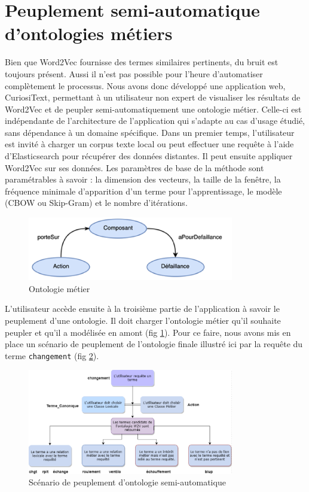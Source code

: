 \section{Peuplement semi-automatique d'ontologies métiers}

Bien que Word2Vec fournisse des termes similaires pertinents, du bruit est toujours présent. Aussi il n'est pas possible pour l'heure d'automatiser complètement le processus. Nous avons donc développé une application web, CuriosiText, permettant à un utilisateur non expert de visualiser les résultats de Word2Vec et de peupler semi-automatiquement une ontologie métier. Celle-ci est indépendante de l'architecture de l'application qui s'adapte au cas d'usage étudié, sans dépendance à un domaine spécifique. Dans un premier temps, l'utilisateur est invité à charger un corpus texte local ou peut effectuer une requête à l'aide d'Elasticsearch pour récupérer des données distantes. Il peut ensuite appliquer Word2Vec sur ses données. Les paramètres de base de la méthode sont paramétrables à savoir : la dimension des vecteurs, la taille de la fenêtre, la fréquence minimale d'apparition d’un terme pour l’apprentissage, le modèle (CBOW ou Skip-Gram) et le nombre d’itérations.
%
\begin{figure}[tb]
    \begin{center}
        \includegraphics[width=9cm]{figures/ontMetier}
    \end{center}
    \caption{Ontologie métier}\label{fig:metier}
\end{figure}
%
L'utilisateur accède ensuite à la troisième partie de l'application à savoir le peuplement d'une ontologie. Il doit charger l’ontologie métier qu'il souhaite peupler et qu'il a modélisée en amont (fig \ref{fig:metier}). Pour ce faire, nous avons mis en place un scénario de peuplement de l'ontologie finale illustré ici par la requête du terme \texttt{changement} (fig \ref{fig:peuplement}).
%
\begin{figure}[tb]
    \begin{center}
        \includegraphics[width=9cm]{figures/peuplement}
    \end{center}
    \caption{Scénario de peuplement d'ontologie semi-automatique}\label{fig:peuplement}
\end{figure}
